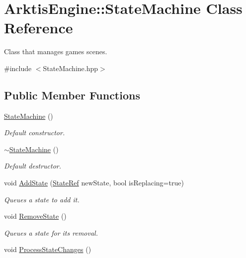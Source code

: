 \hypertarget{class_arktis_engine_1_1_state_machine}{}\section{Arktis\+Engine\+::State\+Machine Class Reference}
\label{class_arktis_engine_1_1_state_machine}


Class that manages game\textquotesingle{}s scenes.  




{\ttfamily \#include $<$State\+Machine.\+hpp$>$}

\subsection*{Public Member Functions}
\begin{DoxyCompactItemize}
\item 
\mbox{\hyperlink{class_arktis_engine_1_1_state_machine_a1118386ad3a25318c596e7cd2973e653}{State\+Machine}} ()
\begin{DoxyCompactList}\small\item\em Default constructor. \end{DoxyCompactList}\item 
\mbox{\hyperlink{class_arktis_engine_1_1_state_machine_a06a79046673c4e0810ea75044f7c833a}{$\sim$\+State\+Machine}} ()
\begin{DoxyCompactList}\small\item\em Default destructor. \end{DoxyCompactList}\item 
void \mbox{\hyperlink{class_arktis_engine_1_1_state_machine_ab9c7ff35ffee13eecfa31436d8158a0f}{Add\+State}} (\mbox{\hyperlink{namespace_arktis_engine_a2df871316f5a55f656d888e1ab2f4531}{State\+Ref}} new\+State, bool is\+Replacing=true)
\begin{DoxyCompactList}\small\item\em Queues a state to add it. \end{DoxyCompactList}\item 
void \mbox{\hyperlink{class_arktis_engine_1_1_state_machine_a3160a6d94f518c43ef6cdc5a39db67cf}{Remove\+State}} ()
\begin{DoxyCompactList}\small\item\em Queues a state for it\textquotesingle{}s removal. \end{DoxyCompactList}\item 
void \mbox{\hyperlink{class_arktis_engine_1_1_state_machine_a49929447f3475376c8073daea61442e7}{Process\+State\+Changes}} ()

\end{DoxyCompactItemize}
